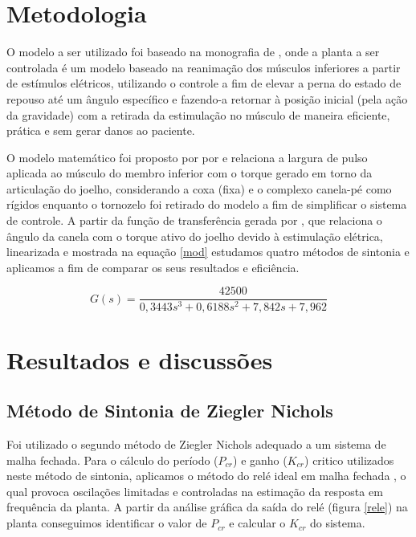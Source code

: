 \documentclass[article,12pt,oneside,a4paper,english,brazil,sumario=tradicional]{abntex2}
\begin{document}
\section{\large Metodologia}
\SingleSpacing

O modelo a ser utilizado foi baseado na monografia de \cite{lovoestudo}, onde a planta a ser controlada é um
modelo baseado na reanimação dos músculos inferiores a partir de estímulos elétricos, utilizando o controle a fim de elevar a perna do estado de repouso até um ângulo específico e fazendo-a retornar à posição inicial (pela ação da gravidade) com a retirada da estimulação no músculo de maneira eficiente, prática e sem gerar danos ao paciente.

O modelo matemático foi proposto por por  e relaciona a largura de pulso aplicada ao músculo do membro inferior com o torque gerado em torno da articulação
do joelho, considerando a coxa (fixa) e o complexo canela-pé como rígidos enquanto o tornozelo foi retirado do modelo a fim de simplificar o sistema de controle. A partir da função de transferência gerada por \cite{lovoestudo}, que relaciona o ângulo da canela com o torque
ativo do joelho devido à estimulação elétrica, linearizada e mostrada na equação \ref{mod} estudamos quatro métodos de sintonia e aplicamos a fim de comparar os seus resultados e eficiência.

\begin{equation}
    G(s) =\frac{42500}{0,3443s^3+0,6188s^2+7,842s+7,962 }
    \label{mod}
\end{equation}


\section{\large Resultados e discussões}
\SingleSpacing

\subsection{\large Método de Sintonia de Ziegler Nichols}

Foi utilizado o segundo método de Ziegler Nichols adequado a um sistema de malha fechada.
Para o cálculo do período ($P_{cr}$) e ganho ($K_{cr}$) critico utilizados neste método de sintonia, aplicamos o método do relé ideal em malha fechada \cite{releas}, o qual provoca oscilações limitadas e controladas na estimação da resposta em frequência da planta. A partir da análise gráfica da saída do relé (figura \ref{rele}) na planta conseguimos identificar o valor de $P_{cr}$ e calcular o $K_{cr}$ do sistema.
\end{document}
